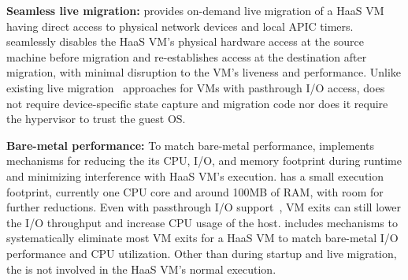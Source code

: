{\bf Seamless live migration:}
\na provides on-demand live migration of a HaaS VM having direct access to 
physical network devices and local APIC timers. 
\na seamlessly disables the HaaS VM's physical hardware access at the 
source machine before migration and 
re-establishes access at the destination after migration,
with minimal disruption to the VM's liveness and performance.
Unlike existing live migration~\cite{vfio-live-migration,blmvisor-journal,ondemand} 
approaches for VMs with pasthrough 
I/O access, \na does not require device-specific state capture and migration code 
nor does it require the hypervisor to trust the guest OS. 

{\bf Bare-metal performance:}  
To match bare-metal performance, \na implements mechanisms
for reducing the its CPU, I/O, and memory footprint
during runtime and minimizing interference with HaaS VM's execution.
\na has a small execution footprint, currently one 
CPU core and around 100MB of RAM, with room for further reductions.
Even with passthrough I/O support~\cite{intelvtd-paper,intelvtd-manual}, 
VM exits can still lower the I/O throughput and increase CPU usage of the host.
\na includes mechanisms to systematically eliminate
most VM exits for a HaaS VM to match bare-metal I/O performance and CPU utilization.
Other than during startup and live migration, the \na is not involved in the
HaaS VM's normal execution.


